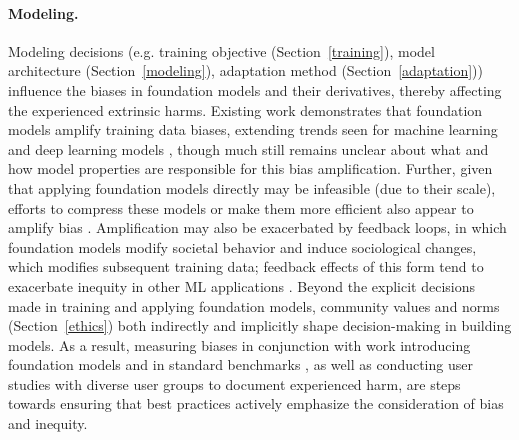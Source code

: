 \paragraph{Modeling.} 
Modeling decisions (e.g. training objective (Section~\ref{training}), model architecture (Section~\ref{modeling}), adaptation method (Section~\ref{adaptation}))  influence the biases in foundation models and their derivatives, thereby affecting the experienced extrinsic harms. Existing work demonstrates that foundation models amplify training data biases, extending trends seen for machine learning and deep learning models \citep{zhao-etal-2017-men,wang2019balanced,jia-etal-2020-mitigating,hashimoto2018fairness}, though much still remains unclear about what and how model properties are responsible for this bias amplification. Further, given that applying foundation models directly may be infeasible (due to their scale), efforts to compress these models or make them more efficient also appear to amplify bias \citep{hooker2020, renduchintala2021}. Amplification may also be exacerbated by feedback loops, in which foundation models modify societal behavior and induce sociological changes, which modifies subsequent training data; feedback effects of this form tend to exacerbate inequity in other  ML applications \cite{lum2016predict,ensign2018runaway,hashimoto2018fairness}. Beyond the explicit decisions made in training and applying foundation models, community values \citep{birhane2020} and norms (Section~\ref{ethics}) both indirectly and implicitly \citep{liu2021} shape decision-making in building models. As a result, measuring biases in conjunction with work introducing foundation models \citep[e.g. ][]{brown2020gpt3} and in standard benchmarks \citep[][Section~\ref{evaluation}]{friedman1996}, as well as conducting user studies with diverse user groups to document experienced harm, are steps towards ensuring that best practices actively emphasize the consideration of bias and inequity.

